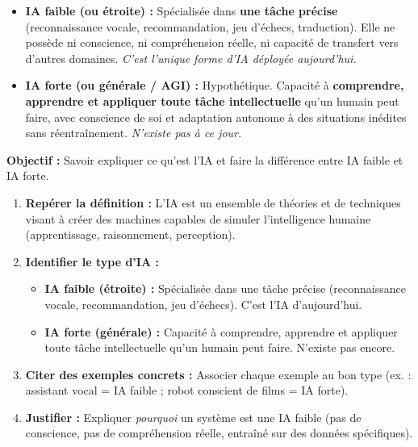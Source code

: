 \documentclass[11pt]{article}
\begin{document}
\begin{propriete}
\begin{itemize}
    \item \textbf{IA faible (ou étroite) :} Spécialisée dans \textbf{une tâche précise} (reconnaissance vocale, recommandation, jeu d'échecs, traduction). Elle ne possède ni conscience, ni compréhension réelle, ni capacité de transfert vers d'autres domaines. \emph{C'est l'unique forme d'IA déployée aujourd'hui.}
    \item \textbf{IA forte (ou générale / AGI) :} Hypothétique. Capacité à \textbf{comprendre, apprendre et appliquer toute tâche intellectuelle} qu'un humain peut faire, avec conscience de soi et adaptation autonome à des situations inédites sans réentraînement. \emph{N'existe pas à ce jour.}
\end{itemize}
\end{propriete}

\begin{methode}
\textbf{Objectif :} Savoir expliquer ce qu'est l'IA et faire la différence entre IA faible et IA forte.
\begin{enumerate}
    \item \textbf{Repérer la définition :} L'IA est un ensemble de théories et de techniques visant à créer des machines capables de simuler l'intelligence humaine (apprentissage, raisonnement, perception).
    \item \textbf{Identifier le type d'IA :}
    \begin{itemize}
        \item \textbf{IA faible (étroite) :} Spécialisée dans une tâche précise (reconnaissance vocale, recommandation, jeu d'échecs). C'est l'IA d'aujourd'hui.
        \item \textbf{IA forte (générale) :} Capacité à comprendre, apprendre et appliquer toute tâche intellectuelle qu'un humain peut faire. N'existe pas encore.
    \end{itemize}
    \item \textbf{Citer des exemples concrets :} Associer chaque exemple au bon type (ex. : assistant vocal = IA faible ; robot conscient de films = IA forte).
    \item \textbf{Justifier :} Expliquer \emph{pourquoi} un système est une IA faible (pas de conscience, pas de compréhension réelle, entraîné sur des données spécifiques).
\end{enumerate}
\end{methode}
\end{document}
